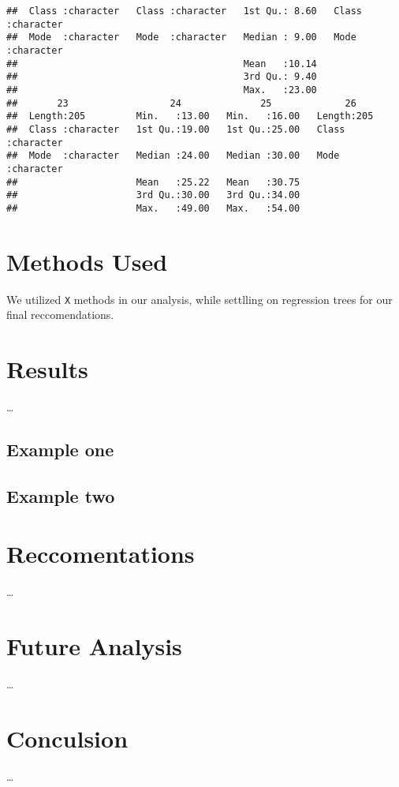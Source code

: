 \documentclass[12pt,]{book}
\theoremstyle{definition}
\theoremstyle{definition}
\theoremstyle{remark}
\begin{document}
\begin{verbatim}
##  Class :character   Class :character   1st Qu.: 8.60   Class :character  
##  Mode  :character   Mode  :character   Median : 9.00   Mode  :character  
##                                        Mean   :10.14                     
##                                        3rd Qu.: 9.40                     
##                                        Max.   :23.00                     
##       23                  24              25             26           
##  Length:205         Min.   :13.00   Min.   :16.00   Length:205        
##  Class :character   1st Qu.:19.00   1st Qu.:25.00   Class :character  
##  Mode  :character   Median :24.00   Median :30.00   Mode  :character  
##                     Mean   :25.22   Mean   :30.75                     
##                     3rd Qu.:30.00   3rd Qu.:34.00                     
##                     Max.   :49.00   Max.   :54.00
\end{verbatim}

\chapter{Methods Used}\label{methods-used}

We utilized \texttt{X} methods in our analysis, while settlling on
regression trees for our final reccomendations.

\chapter{Results}\label{results}

\ldots{}

\section{Example one}\label{example-one}

\section{Example two}\label{example-two}

\chapter{Reccomentations}\label{reccomentations}

\ldots{}

\chapter{Future Analysis}\label{future-analysis}

\ldots{}

\chapter{Conculsion}\label{conculsion}

\ldots{}


\end{document}

